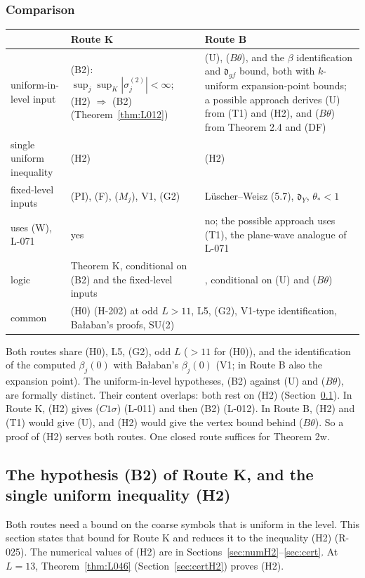 \subsubsection{Comparison}\label{sec:compare}
\begin{longtable}{|p{3.2cm}|p{5.6cm}|p{6.2cm}|}
\hline
 & Route K & Route B \\ \hline
uniform-in-level input & (B2): $\sup_j\sup_{K}|\sigma_j^{(2)}|<\infty$; (H2) $\Rightarrow$ (B2) (Theorem~\ref{thm:L012}) & (U), ($B\theta$), and the $\beta$ identification and $\mathfrak d_{gf}$ bound, both with $k$-uniform expansion-point bounds; a possible approach derives (U) from (T1) and (H2), and ($B\theta$) from Theorem 2.4 and (DF) \\ \hline
single uniform inequality & (H2) & (H2) \\ \hline
fixed-level inputs & (PI), (F), ($M_j$), V1, (G2) & L\"uscher--Weisz (5.7), $\mathfrak d_Y$, $\theta_*<1$ \\ \hline
uses (W), L-071 & yes & no; the possible approach uses (T1), the plane-wave analogue of L-071 \\ \hline
logic & Theorem K, conditional on (B2) and the fixed-level inputs & \ThmPW{}, conditional on (U) and ($B\theta$) \\ \hline
common & \multicolumn{2}{p{11.8cm}|}{(H0) (H-202) at odd $L>11$, L5, (G2), V1-type identification, Ba{\l}aban's proofs, SU(2)} \\ \hline
\end{longtable}
Both routes share (H0), L5, (G2), odd $L$ ($>11$ for (H0)), and the identification of the computed $\beta_j(0)$ with Ba{\l}aban's $\beta_j(0)$ (V1; in Route B also the expansion point). The uniform-in-level hypotheses, (B2) against (U) and ($B\theta$), are formally distinct. Their content overlaps: both rest on (H2) (Section~\ref{sec:H2}). In Route K, (H2) gives ($C1\sigma$) (L-011) and then (B2) (L-012). In Route B, (H2) and (T1) would give (U), and (H2) would give the vertex bound behind ($B\theta$). So a proof of (H2) serves both routes. One closed route suffices for Theorem 2w.

\subsection{The hypothesis (B2) of Route K, and the single uniform inequality (H2)}\label{sec:H2}\label{sec:B2}

Both routes need a bound on the coarse symbols that is uniform in the level. This section states that bound for Route K and reduces it to the inequality (H2) (R-025). The numerical values of (H2) are in Sections~\ref{sec:numH2}--\ref{sec:cert}. At $L=13$, Theorem~\ref{thm:L046} (Section~\ref{sec:certH2}) proves (H2).

